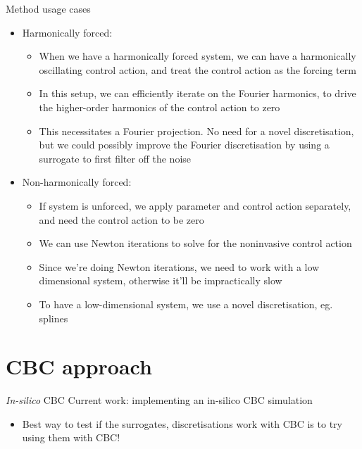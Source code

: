 \documentclass[presentation]{beamer}
\begin{document}
\begin{frame}[plain,label={sec:org6e32cd1}]{Method usage cases}
\begin{itemize}
\item Harmonically forced:
\begin{itemize}
\item When we have a harmonically forced system, we can have a harmonically oscillating control action, and treat the control action as the forcing term
\item In this setup, we can efficiently iterate on the Fourier harmonics, to drive the higher-order harmonics of the control action to zero
\item This necessitates a Fourier projection. No need for a novel discretisation, but we could possibly improve the Fourier discretisation by using a surrogate to first filter off the noise
\end{itemize}

\item Non-harmonically forced:
\begin{itemize}
\item If system is unforced, we apply parameter and control action separately, and need the control action to be zero
\item We can use Newton iterations to solve for the noninvasive control action
\item Since we're doing Newton iterations, we need to work with a low dimensional system, otherwise it'll be impractically slow
\item To have a low-dimensional system, we use a novel discretisation, eg. splines
\end{itemize}
\end{itemize}
\end{frame}
\section{CBC approach}
\label{sec:orgd207c9d}
\begin{frame}[plain,label={sec:orgaffdccc}]{\emph{In-silico} CBC}
Current work: implementing an in-silico CBC simulation
\begin{itemize}
\item Best way to test if the surrogates, discretisations work with CBC is to try using them with CBC!
\end{itemize}
\end{frame}
\end{document}
